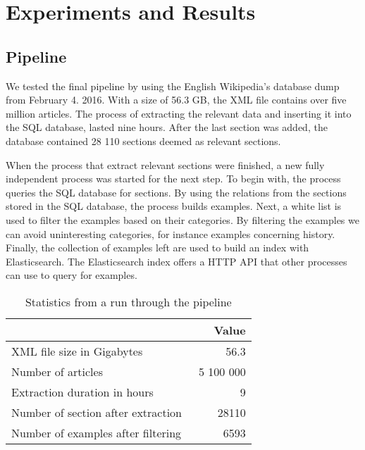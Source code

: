 
\chapter{Experiments and Results}

\section{Pipeline}



We tested the final pipeline by using the English Wikipedia's database dump from February 4. 2016. With a size of 56.3 GB, the XML file contains over five million articles. The process of extracting the relevant data and inserting it into the SQL database, lasted nine hours. After the last section was added, the database contained 28 110 sections deemed as relevant sections.

When the process that extract relevant sections were finished, a new fully independent process was started for the next step. To begin with, the process queries the SQL database for sections. By using the relations from the sections stored in the SQL database, the process builds examples. Next, a white list is used to filter the examples based on their categories. By filtering the examples we can avoid uninteresting categories, for instance examples concerning history. Finally, the collection of examples left are used to build an index with Elasticsearch. The Elasticsearch index offers a HTTP API that other processes can use to query for examples.

\begin{table}[h!]
\centering
\begin{tabular} {|| p{15em} | r ||} 
 \hline
  & Value \\ [0.5ex] 
 \hline
XML file size in Gigabytes & 56.3 \\
Number of articles & ~5 100 000 \\
Extraction duration in hours & ~9 \\
Number of section after extraction & 28110 \\
Number of examples after filtering & 6593 \\

 \hline
\end{tabular}
\caption{Statistics from a run through the pipeline}
\label{table:run_statistics}
\end{table}


